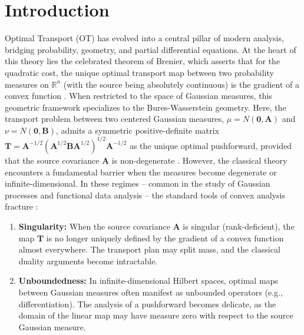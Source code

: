 \documentclass[noinfoline]{imsart}\setcounter{tocdepth}{2}
\renewcommand{\b}[1]{\mathbb{#1}} %
\newcommand{\m}[1]{\mathbf{#1}} %
\theoremstyle{plain}
\begin{document}
\maketitle

\section{Introduction}
Optimal Transport (OT) has evolved into a central pillar of modern analysis, bridging probability, geometry, and partial differential equations. At the heart of this theory lies the celebrated theorem of Brenier, which asserts that for the quadratic cost, the unique optimal transport map between two probability measures on $\b{R}^{n}$ (with the source being absolutely continuous) is the gradient of a convex function \cite{villani2008optimal, villani2021topics, ambrosio2008gradient}. When restricted to the space of Gaussian measures, this geometric framework specializes to the Bures-Wasserstein geometry. Here, the transport problem between two centered Gaussian measures, $\mu=N(\m{0}, \m{A})$ and $\nu=N(\m{0}, \m{B})$, admits a symmetric positive-definite matrix $\m{T} = \m{A}^{-1/2} (\m{A}^{1/2} \m{B} \m{A}^{1/2})^{1/2} \m{A}^{-1/2}$ as the unique optimal pushforward, provided that the source covariance $\m{A}$ is non-degenerate \cite{knott1984optimal, ruschendorf1990characterization, pusz1975functional, bhatia2019bures}.
However, the classical theory encounters a fundamental barrier when the measures become degenerate or infinite-dimensional. In these regimes -- common in the study of Gaussian processes and functional data analysis \cite{dryden2016statistical, pigoli2014distances, masarotto2019procrustes, kroshnin2021statistical} -- the standard tools of convex analysis fracture \cite{rockafellar1970convex}:
\begin{enumerate}[leftmargin = *]
\item \textbf{Singularity:} When the source covariance $\m{A}$ is singular (rank-deficient), the map $\m{T}$ is no longer uniquely defined by the gradient of a convex function almost everywhere. The transport plan may split mass, and the classical duality arguments become intractable.
\item \textbf{Unboundedness:} In infinite-dimensional Hilbert spaces, optimal maps between Gaussian measures often manifest as unbounded operators (e.g., differentiation). The analysis of a pushforward becomes delicate, as the domain of the linear map may have measure zero with respect to the source Gaussian measure.
\end{enumerate}
\end{document}
